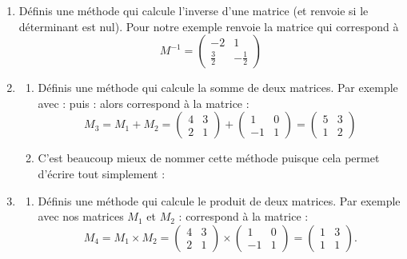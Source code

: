 \documentclass[11pt,class=report,crop=false]{standalone}
\begin{document}
\begin{activite}[Matrices]
\begin{enumerate}
  \item Définis une méthode  qui calcule l'inverse d'une matrice (et renvoie  si le déterminant est nul).
  Pour notre exemple  renvoie la matrice qui correspond à 
 $$M^{-1} = \begin{pmatrix}-2&1\\\frac32&-\frac12\end{pmatrix}$$
 
 
 \item 
 \begin{enumerate}
   \item Définis une méthode  qui calcule la somme de deux matrices.
Par exemple avec :
puis :
alors  correspond à la matrice :
$$M_3 = M_1+M_2 = \begin{pmatrix}4&3\\2&1\end{pmatrix} + \begin{pmatrix}1&0\\-1&1\end{pmatrix}
= \begin{pmatrix}5&3\\1&2\end{pmatrix}$$
   
   \item C'est beaucoup mieux de nommer cette méthode  puisque cela permet d'écrire tout simplement : 
 \end{enumerate}
  
  \item 
   \begin{enumerate}
   \item Définis une méthode  qui calcule le produit de deux matrices.
Par exemple avec nos matrices $M_1$ et $M_2$ :
correspond à la matrice :
$$M_4 = M_1 \times M_2 = \begin{pmatrix}4&3\\2&1\end{pmatrix} \times \begin{pmatrix}1&0\\-1&1\end{pmatrix}
= \begin{pmatrix}1&3\\1&1\end{pmatrix}.$$
   

\end{enumerate}
\end{enumerate}
\end{activite}
\end{document}
